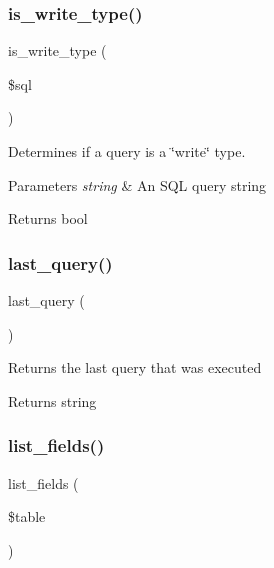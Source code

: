\subsubsection{\texorpdfstring{is\+\_\+write\+\_\+type()}{is\_write\_type()}}
{\footnotesize\ttfamily is\+\_\+write\+\_\+type (\begin{DoxyParamCaption}\item[{}]{\$sql }\end{DoxyParamCaption})}

Determines if a query is a \char`\"{}write\char`\"{} type.


\begin{DoxyParams}{Parameters}
{\em string} & An S\+QL query string \\
\hline
\end{DoxyParams}
\begin{DoxyReturn}{Returns}
bool 
\end{DoxyReturn}
\mbox{\label{class_c_i___d_b__driver_a8117354f1fa0b2873f0ad2792dc21389}} 
\subsubsection{\texorpdfstring{last\+\_\+query()}{last\_query()}}
{\footnotesize\ttfamily last\+\_\+query (\begin{DoxyParamCaption}{ }\end{DoxyParamCaption})}

Returns the last query that was executed

\begin{DoxyReturn}{Returns}
string 
\end{DoxyReturn}
\mbox{\label{class_c_i___d_b__driver_aef08cd376b16b24608100ca0e3f2f85b}} 
\subsubsection{\texorpdfstring{list\+\_\+fields()}{list\_fields()}}
{\footnotesize\ttfamily list\+\_\+fields (\begin{DoxyParamCaption}\item[{}]{\$table }\end{DoxyParamCaption})}


